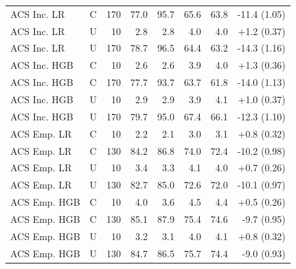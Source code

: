\begin{table}[t]
\begin{tabular}{llrrrrrr}
ACS Inc. LR & C & 170 & 77.0 & 95.7 & 65.6 & 63.8 & -11.4 (1.05) \\
ACS Inc. LR & U & 10 & 2.8 & 2.8 & 4.0 & 4.0 & +1.2 (0.37) \\
ACS Inc. LR & U & 170 & 78.7 & 96.5 & 64.4 & 63.2 & -14.3 (1.16) \\
ACS Inc. HGB & C & 10 & 2.6 & 2.6 & 3.9 & 4.0 & +1.3 (0.36) \\
ACS Inc. HGB & C & 170 & 77.7 & 93.7 & 63.7 & 61.8 & -14.0 (1.13) \\
ACS Inc. HGB & U & 10 & 2.9 & 2.9 & 3.9 & 4.1 & +1.0 (0.37) \\
ACS Inc. HGB & U & 170 & 79.7 & 95.0 & 67.4 & 66.1 & -12.3 (1.10) \\
ACS Emp. LR & C & 10 & 2.2 & 2.1 & 3.0 & 3.1 & +0.8 (0.32) \\
ACS Emp. LR & C & 130 & 84.2 & 86.8 & 74.0 & 72.4 & -10.2 (0.98) \\
ACS Emp. LR & U & 10 & 3.4 & 3.3 & 4.1 & 4.0 & +0.7 (0.26) \\
ACS Emp. LR & U & 130 & 82.7 & 85.0 & 72.6 & 72.0 & -10.1 (0.97) \\
ACS Emp. HGB & C & 10 & 4.0 & 3.6 & 4.5 & 4.4 & +0.5 (0.26) \\
ACS Emp. HGB & C & 130 & 85.1 & 87.9 & 75.4 & 74.6 & -9.7 (0.95) \\
ACS Emp. HGB & U & 10 & 3.2 & 3.1 & 4.0 & 4.1 & +0.8 (0.32) \\
ACS Emp. HGB & U & 130 & 84.7 & 86.5 & 75.7 & 74.4 & -9.0 (0.93) \\
\bottomrule
\end{tabular}
\end{table}
